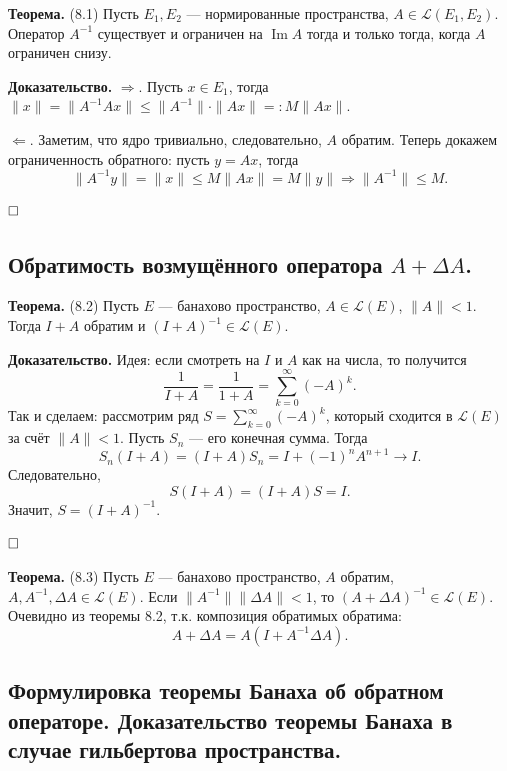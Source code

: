 \documentclass[12pt, a4paper]{article}
\DeclareMathOperator{\im}{Im}
\newcommand{\QED}{$\hfill\square$}
\renewcommand{\le}{\leqslant}  %
\begin{document}
 \label{th:8-1} \textbf{Теорема.} (8.1) Пусть $E_1, E_2$ --- нормированные пространства, $A \in \mathcal L(E_1, E_2)$.
Оператор $A^{-1}$ существует и ограничен на $\im A$ тогда и только тогда, когда $A$ ограничен снизу.

\textbf{Доказательство.} $\Rightarrow$. Пусть $x \in E_1$, тогда $\|x\| = \|A^{-1} A x\| \le \|A^{-1}\| \cdot \|Ax\| =: M\|Ax\|$.

$\Leftarrow$. Заметим, что ядро тривиально, следовательно, $A$ обратим.
Теперь докажем ограниченность обратного: пусть $y = Ax$, тогда
\[
    \|A^{-1} y\| = \|x\| \le M\|Ax\| = M\|y\| \Longrightarrow \|A^{-1}\| \le M.
\]

\QED



\subsection{Обратимость возмущённого оператора \texorpdfstring{$A + \Delta A$}{A + Delta A}.}

 \label{th:8-2} \textbf{Теорема.} (8.2) Пусть $E$ --- банахово пространство, $A \in \mathcal L(E)$, $\|A\| < 1$.
Тогда $I + A$ обратим и $(I + A)^{-1} \in \mathcal L(E)$.

\textbf{Доказательство.} Идея: если смотреть на $I$ и $A$ как на числа, то получится
\[
    \frac{1}{I + A} = \frac{1}{1 + A} = \sum_{k=0}^{\infty} (-A)^k.
\]
Так и сделаем: рассмотрим ряд $S = \sum_{k=0}^{\infty} (-A)^k$, который сходится в $\mathcal{L}(E)$ за счёт $\|A\| < 1$. Пусть $S_n$ --- его конечная сумма. 
Тогда 
\[
    S_n(I + A) = (I + A) S_n = I + (-1)^n A^{n+1} \to I.
\]
Следовательно,
\[
    S(I + A) = (I + A)S = I.
\]
Значит, $S = (I + A)^{-1}$.

\QED

 \label{th:8-3} \textbf{Теорема.} (8.3) Пусть $E$ --- банахово пространство, $A$ обратим, $A, A^{-1}, \Delta A \in \mathcal L(E)$.
Если $\|A^{-1}\|\|\Delta A\| < 1$, то $(A + \Delta A)^{-1} \in \mathcal L(E)$.
Очевидно из теоремы 8.2, т.к. композиция обратимых обратима:
\[
    A + \Delta A = A (I + A^{-1} \Delta A).
\]



\subsection{Формулировка теоремы Банаха об обратном операторе. Доказательство теоремы Банаха в случае гильбертова пространства.}
\end{document}
